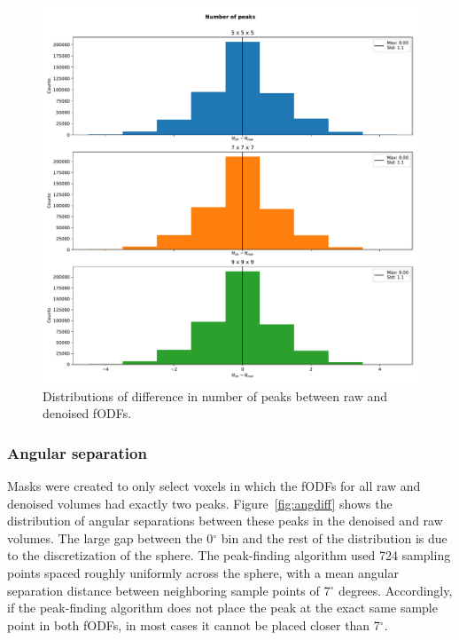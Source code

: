 \documentclass{article}
\begin{document}
\begin{figure}[H]
  \centering
  \includegraphics[width=0.6\linewidth]{../figs/numpeaks}
  \captionsetup{width=0.6\linewidth}
  \caption{Distributions of difference in number of peaks between raw and
    denoised fODFs.}
  \label{fig:numpeaks}
\end{figure}

\subsubsection{Angular separation}
Masks were created to only select voxels in which the fODFs for all raw and
denoised volumes had exactly two peaks. Figure~\ref{fig:angdiff} shows the
distribution of angular separations between these peaks in the denoised and raw
volumes. The large gap between the 0$^{\circ}$ bin and the rest of the
distribution is due to the discretization of the sphere. The peak-finding
algorithm used 724 sampling points spaced roughly uniformly across the sphere,
with a mean angular separation distance between neighboring sample points of
7$^{\circ}$ degrees. Accordingly, if the peak-finding algorithm does not place
the peak at the exact same sample point in both fODFs, in most cases it cannot
be placed closer than 7$^{\circ}$.
\end{document}
